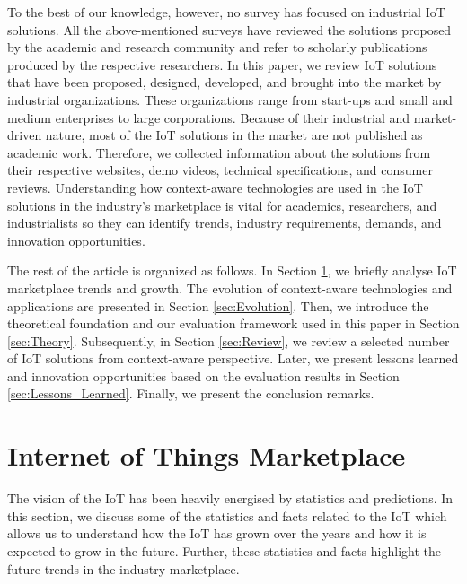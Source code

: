 \documentclass[journal]{IEEEtran}
\begin{document}
To the best of our knowledge, however, no survey has focused on industrial IoT solutions. All the above-mentioned surveys have reviewed the solutions proposed by the academic and research community and refer to scholarly publications produced by the respective researchers. In this paper, we review IoT solutions that have been proposed, designed, developed, and brought into the market by industrial organizations. These organizations range from start-ups and small and medium enterprises to large corporations. Because of their industrial and market-driven nature, most of the IoT solutions in the market are not published as academic work. Therefore, we collected information about the solutions from their respective websites, demo videos, technical specifications, and consumer reviews. Understanding how context-aware technologies are used in the IoT solutions in the industry's marketplace is vital for academics, researchers, and industrialists so they can identify trends, industry requirements, demands, and innovation opportunities. 

The rest of the article is organized as follows. In Section \ref{sec:Classification}, we briefly analyse IoT marketplace trends and growth. The evolution of context-aware technologies and applications are presented in Section \ref{sec:Evolution}. Then, we introduce the theoretical foundation and our evaluation framework used in this paper in Section \ref{sec:Theory}. Subsequently, in Section \ref{sec:Review}, we review a selected number of IoT solutions from context-aware perspective. Later, we present lessons learned and innovation opportunities based on the evaluation results in Section \ref{sec:Lessons_Learned}. Finally, we present the conclusion remarks.







\section{Internet of Things Marketplace}
\label{sec:Classification}

The vision of the IoT has been heavily  energised by statistics and predictions. In this section, we discuss some of the statistics and facts related to the IoT which allows us to understand how the IoT has grown over the years and how it is expected to grow in the future. Further, these statistics and facts highlight the future trends in the industry marketplace. 
\end{document}
